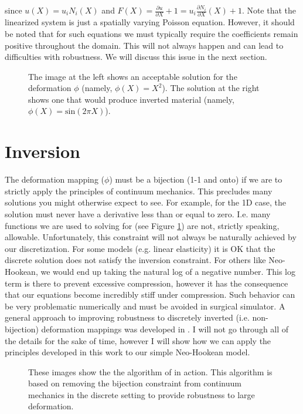 \documentclass[article]{pcms-l}
\begin{document}
since $u(X)=u_iN_i(X)$ and $F(X)=\frac{\partial{u}}{\partial{X}}+1=u_i\frac{\partial{N_i}}{\partial{X}}(X)+1$. Note that the linearized system is just a spatially varying Poisson equation. However, it should be noted that for such equations we must typically require the coefficients remain positive throughout the domain. This will not always happen and can lead to difficulties with robustness. We will discuss this issue in the next section.
\begin{figure}
\caption{The image at the left shows an acceptable solution for the deformation $\phi$ (namely, $\phi(X)=X^2$). The solution at the right shows one that would produce inverted material (namely, $\phi(X)=\textrm{sin}(2\pi{X})$).}
\label{inversion}
\end{figure}
\section*{Inversion}
The deformation mapping ($\phi$) must be a bijection (1-1 and onto) if we are to strictly apply the principles of continuum mechanics. This precludes many solutions you might otherwise expect to see. For example, for the 1D case, the solution must never have a derivative less than or equal to zero. I.e. many functions we are used to solving for (see Figure \ref{inversion}) are not, strictly speaking, allowable. Unfortunately, this constraint will not always be naturally achieved by our discretization. For some models (e.g. linear elasticity) it is OK that the discrete solution does not satisfy the inversion constraint. For others like Neo-Hookean, we would end up taking the natural log of a negative number. This log term is there to prevent excessive compression, however it has the consequence that our equations become incredibly stiff under compression. Such behavior can be very problematic numerically and must be avoided in surgical simulator. A general approach to improving robustness to discretely inverted (i.e. non-bijection) deformation mappings was developed in \cite{Irving06}. I will not go through all of the details for the sake of time, however I will show how we can apply the principles developed in this work to our simple Neo-Hookean model.\\
\begin{figure}
\caption{These images show the the algorithm of \cite{Irving06} in action. This algorithm is based on removing the bijection constraint from continuum mechanics in the discrete setting to provide robustness to large deformation.}
\label{inversion2}
\end{figure}
\end{document}
